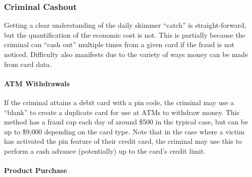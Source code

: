 \subsubsection{Criminal Cashout}

Getting a clear understanding of the daily skimmer ``catch'' is straight-forward, but the quantification of the
economic cost is not.
%
This is partially because the criminal can ``cash out'' multiple times from a given card if the fraud is not noticed.
%
Difficulty also manifests due to the variety of ways money can be made from card data.

\paragraph{ATM Withdrawals}
If the criminal attains a debit card with a pin code, the criminal may use a ``blank'' to create a duplicate card for
use at ATMs to withdraw money.
%
This method has a fraud cap each day of around \$500 in the typical case, but can be up to \$9,000 depending on the
card type. \cite{boaWithdrawalLimit, debitCapsForEachBank}
%
Note that in the case where a victim has activated the pin feature of their credit card, the criminal may use this to
perform a cash advance (potentially) up to the card's credit limit. \cite{boaCashAdvanceFaq}



%
%



\paragraph{Product Purchase}

